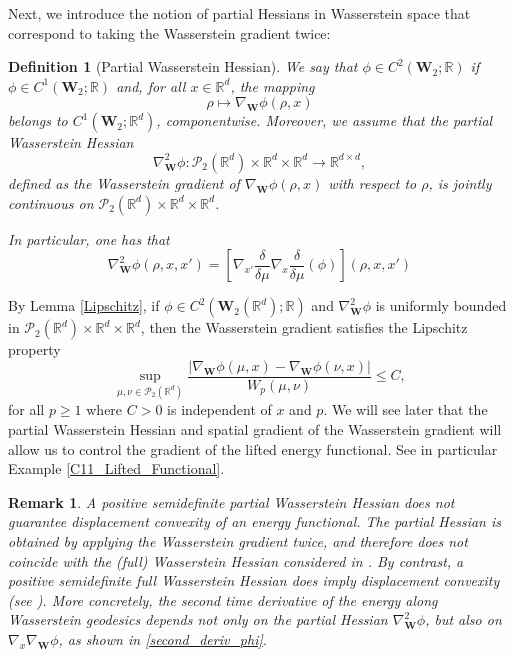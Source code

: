 \documentclass[11pt,a4paper]{amsart}
\newcommand{\1}{\mathds{1}}
\newcommand{\R}{{\mathbb R}}
\newtheorem{definition}[theorem]{\textbf{Definition}}
\newtheorem{remark}[theorem]{\textbf{Remark}}
\numberwithin{equation}{section}
\begin{document}
Next, we introduce the notion of partial Hessians in Wasserstein space that correspond to taking the Wasserstein gradient twice:

\smallskip

\begin{definition} [Partial Wasserstein Hessian] 
We say that $\phi \in C^2(\mathbf{W}_2; \mathbb{R})$ if $\phi \in C^1(\mathbf{W}_2; \mathbb{R})$ and, for all $x \in \mathbb{R}^d$, the mapping
\[
\rho \mapsto \nabla_{\mathbf{W}} \phi(\rho, x)
\]
belongs to $C^1(\mathbf{W}_2; \mathbb{R}^d)$, componentwise. Moreover, we assume that the partial Wasserstein Hessian
\[
\nabla^2_{\mathbf{W}} \phi : \mathcal{P}_2(\mathbb{R}^d) \times \mathbb{R}^d \times \mathbb{R}^d \to \mathbb{R}^{d \times d},
\]
defined as the Wasserstein gradient of $\nabla_{\mathbf{W}} \phi(\rho, x)$ with respect to $\rho$, is jointly continuous on $\mathcal{P}_2(\mathbb{R}^d) \times \mathbb{R}^d \times \mathbb{R}^d$. \smallskip

In particular, one has that
\[ \nabla^2_{\mathbf{W}} \phi(\rho,x,x') = \left[ \nabla_{x'} \frac{\delta}{\delta \mu} \nabla_x \frac{\delta}{\delta \mu} \left( \phi \right) \right](\rho,x,x')  \]

\end{definition}


\smallskip

By Lemma \ref{Lipschitz}, if $\phi \in C^2(\mathbf{W}_2(\R^d);\R)$ and $\nabla^2_{\mathbf{W}} \phi$ is uniformly bounded in $\mathcal{P}_2(\R^d) \times \R^d \times \R^d$, then the Wasserstein gradient satisfies the Lipschitz property
\begin{equation}
\sup_{\mu,\nu \in \mathcal{P}_2(\R^d)} \frac{|\nabla_{\mathbf{W}} \phi(\mu,x)-\nabla_{\mathbf{W}} \phi(\nu,x)|}{W_p(\mu,\nu)} \leq C, \label{gradient_Lipschitz_Wp}
\end{equation}
\noindent for all $p \geq 1$ where $C > 0$ is independent of $x$ and $p$. We will see later that the partial Wasserstein Hessian and spatial gradient of the Wasserstein gradient will allow us to control the gradient of the lifted energy functional. See in particular Example \ref{C11_Lifted_Functional}.\smallskip



\begin{remark}
A positive semidefinite \emph{partial} Wasserstein Hessian does \emph{not} guarantee displacement 
convexity of an energy functional. The partial Hessian is obtained by applying the Wasserstein 
gradient twice, and therefore does not coincide with the (full) Wasserstein Hessian considered in 
\cite[Definition~3.1]{chow2019partial}. By contrast, a positive semidefinite full Wasserstein Hessian 
does imply displacement convexity (see \cite[Lemma~4.1]{parker2024some}).
More concretely, the second time derivative of the energy along Wasserstein geodesics depends not 
only on the partial Hessian $\nabla^2_{\mathbf{W}}\phi$, but also on
$\nabla_x \nabla_{\mathbf{W}}\phi$, as shown in \eqref{second_deriv_phi}.
\end{remark}
\end{document}
